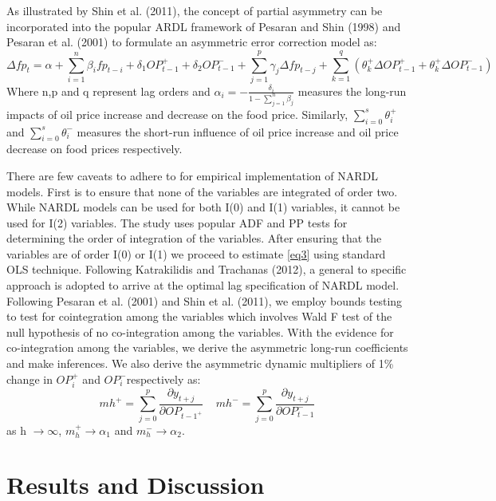 \documentclass[a4paper,12pt]{article}
\begin{document}
As illustrated by Shin et al. (2011), the concept of partial asymmetry can be incorporated into the popular ARDL framework of Pesaran and Shin (1998) and Pesaran et al. (2001) to formulate an asymmetric error correction model as:
\begin{equation}\label{eq3}
	\Delta fp_t=\alpha+\sum_{i=1}^{n}\beta_ifp_{t-i}+\delta_1OP_{t-1}^++\delta_2OP_{t-1}^-+\sum_{j=1}^{p}\gamma_j \Delta fp_{t-j}+\sum_{k=1}^{q}\left(\theta_k^+ \Delta OP_{t-1}^++\theta_k^+ \Delta OP_{t-1}^-\right)
\end{equation}
	Where n,p and q represent lag orders and $ \alpha_i = - \frac{\delta_i}{1-\sum_{j=1}^{n}\beta_j}$ measures the long-run impacts of oil price increase and decrease on the food price. Similarly,  $\sum_{i=0}^{s}\theta_i^+$ and $\sum_{i=0}^{s}\theta_i^-$  measures the short-run influence of oil price increase and oil price decrease on food prices respectively.  
	
	There are few caveats to adhere to for empirical implementation of NARDL models. First is to ensure that none of the variables are integrated of order two. While NARDL models can be used for both I(0) and I(1) variables, it cannot be used for I(2) variables. The study uses popular ADF and PP tests for determining the order of integration of the variables. After ensuring that the variables are of order I(0) or I(1) we proceed to estimate \eqref{eq3} using standard OLS technique. Following Katrakilidis and Trachanas (2012), a general to specific approach is adopted to arrive at the optimal lag specification of NARDL model. Following Pesaran et al. (2001) and Shin et al. (2011), we employ bounds testing to test for cointegration among the variables which involves  Wald F test of the null hypothesis of no co-integration among the variables. With the evidence for co-integration among the variables, we derive the asymmetric long-run coefficients and make inferences. We also derive the asymmetric dynamic multipliers of 1\% change in $ OP_i^+ $  and $ OP_i^- $respectively as: 
	\begin{equation}
			mh^+= \sum_{j=0}^{p}\frac{\partial y_{t+j}}{\partial OP_{t-1^+}}\; \; \; \; mh^-= \sum_{j=0}^{p}\frac{\partial y_{t+j}}{\partial OP_{t-1}^-}
	\end{equation}
as h $\rightarrow \infty$, $ m_h^+ \rightarrow \alpha_1 $ and $ m_h^- \rightarrow \alpha_2 $.

\section{Results and Discussion}
\end{document}
